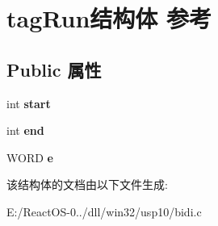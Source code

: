 \hypertarget{structtag_run}{}\section{tag\+Run结构体 参考}
\label{structtag_run}
\subsection*{Public 属性}
\begin{DoxyCompactItemize}
\item 
\mbox{\label{structtag_run_a55f15115978fbae16b6e5d45515a778a}} 
int {\bfseries start}
\item 
\mbox{\label{structtag_run_a6d8a313fb87e5f6cb07b08b43442d5b3}} 
int {\bfseries end}
\item 
\mbox{\label{structtag_run_ade7b9a22a11fc733de5e858e1bc2e420}} 
W\+O\+RD {\bfseries e}
\end{DoxyCompactItemize}


该结构体的文档由以下文件生成\+:\begin{DoxyCompactItemize}
\item 
E\+:/\+React\+O\+S-\/0../dll/win32/usp10/bidi.\+c\end{DoxyCompactItemize}
